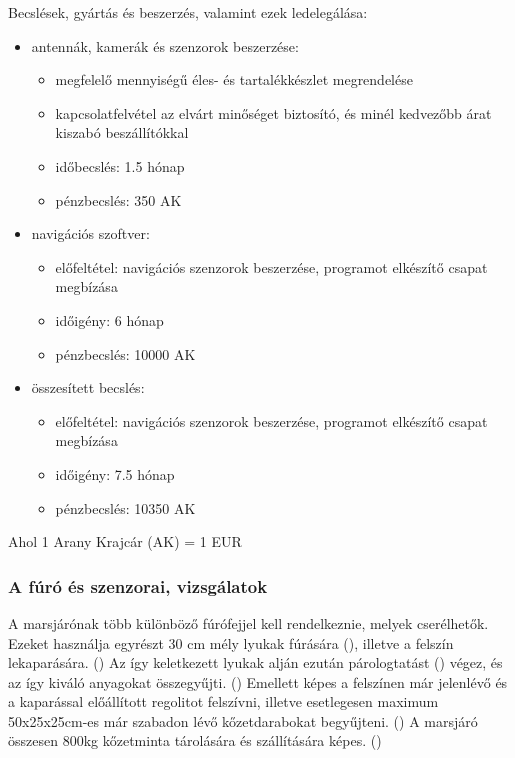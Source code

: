 \documentclass[12pt]{report}
\begin{document}
Becslések, gyártás és beszerzés, valamint ezek ledelegálása:
\begin{itemize}
  \item antennák, kamerák és szenzorok beszerzése: \begin{itemize}
      \item megfelelő mennyiségű éles- és tartalékkészlet megrendelése
      \item kapcsolatfelvétel az elvárt minőséget biztosító, és minél kedvezőbb árat kiszabó beszállítókkal
      \item időbecslés: 1.5 hónap
      \item pénzbecslés: 350 AK
    \end{itemize}
  \item {} navigációs szoftver: \begin{itemize}
      \item előfeltétel: navigációs szenzorok beszerzése, programot elkészítő csapat megbízása
      \item időigény: 6 hónap
      \item pénzbecslés: 10000 AK
    \end{itemize}
  \item összesített becslés: \begin{itemize}
      \item előfeltétel: navigációs szenzorok beszerzése, programot elkészítő csapat megbízása
      \item időigény: 7.5 hónap
      \item pénzbecslés: 10350 AK
    \end{itemize}
\end{itemize}

Ahol 1 Arany Krajcár (AK) = 1 EUR

\subsubsection{A fúró és szenzorai, vizsgálatok}

A marsjárónak több különböző fúrófejjel kell rendelkeznie, melyek cserélhetők. Ezeket használja egyrészt 30 cm mély lyukak fúrására (), illetve a felszín lekaparására. () Az így keletkezett lyukak alján ezután párologtatást () végez, és az így kiváló anyagokat összegyűjti. () Emellett képes a felszínen már jelenlévő és a kaparással előállított regolitot felszívni, illetve esetlegesen maximum 50x25x25cm-es már szabadon lévő kőzetdarabokat begyűjteni. ()  A marsjáró összesen 800kg kőzetminta tárolására és szállítására képes. () 
\end{document}
